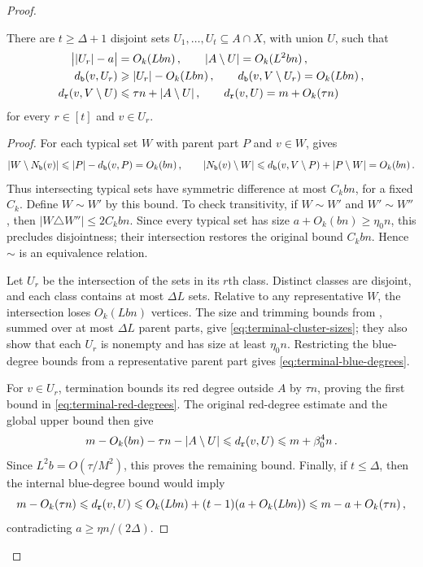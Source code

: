 \begin{proof}
\begin{claim}\label{claim:terminal-clusters}
There are $t\geq\Delta+1$ disjoint sets $U_1,\dots,U_t\subseteq A\cap X$, with union $U$, such that
\begin{align}
\big||U_r|-a\big|&=O_k(Lbn)\,,\qquad |A\setminus U|=O_k(L^2bn)\,,\label{eq:terminal-cluster-sizes}\\
d_{\normalfont\texttt b}(v,U_r)&\geqslant|U_r|-O_k(Lbn)\,,\qquad d_{\normalfont\texttt b}(v,V\setminus U_r)=O_k(Lbn)\,,\label{eq:terminal-blue-degrees}\\
d_{\normalfont\texttt r}(v,V\setminus U)&\leqslant\tau n+|A\setminus U|\,,\qquad d_{\normalfont\texttt r}(v,U)=m+O_k(\tau n)\label{eq:terminal-red-degrees}
\end{align}
for every $r\in[t]$ and $v\in U_r$.
\end{claim}
\begin{proof}
For each typical set $W$ with parent part $P$ and $v\in W$,  gives
$$|W\setminus N_{\normalfont\texttt b}(v)|\leqslant|P|-d_{\normalfont\texttt b}(v,P)=O_k(bn)\,,\qquad |N_{\normalfont\texttt b}(v)\setminus W|\leqslant d_{\normalfont\texttt b}(v,V\setminus P)+|P\setminus W|=O_k(bn)\,.$$
Thus intersecting typical sets have symmetric difference at most $C_kbn$, for a fixed $C_k$. Define $W\sim W'$ by this bound. To check transitivity, if $W\sim W'$ and $W'\sim W''$, then $|W\triangle W''|\leq2C_kbn$. Since every typical set has size $a+O_k(bn)\geq\eta_0n$, this precludes disjointness; their intersection restores the original bound $C_kbn$. Hence $\sim$ is an equivalence relation.

Let $U_r$ be the intersection of the sets in its $r$th class. Distinct classes are disjoint, and each class contains at most $\Delta L$ sets. Relative to any representative $W$, the intersection loses $O_k(Lbn)$ vertices. The size and trimming bounds from , summed over at most $\Delta L$ parent parts, give \eqref{eq:terminal-cluster-sizes}; they also show that each $U_r$ is nonempty and has size at least $\eta_0n$. Restricting the blue-degree bounds from a representative parent part gives \eqref{eq:terminal-blue-degrees}.

For $v\in U_r$, termination bounds its red degree outside $A$ by $\tau n$, proving the first bound in \eqref{eq:terminal-red-degrees}. The original red-degree estimate and the global upper bound then give
$$m-O_k(bn)-\tau n-|A\setminus U|\leqslant d_{\normalfont\texttt r}(v,U)\leqslant m+\beta_0^4n\,.$$
Since $L^2b=O(\tau/M^2)$, this proves the remaining bound. Finally, if $t\leq\Delta$, then the internal blue-degree bound would imply
$$m-O_k(\tau n)\leqslant d_{\normalfont\texttt r}(v,U)\leqslant O_k(Lbn)+(t-1)(a+O_k(Lbn))\leqslant m-a+O_k(\tau n)\,,$$
contradicting $a\geq\eta n/(2\Delta)$.
\end{proof}


\end{proof}
